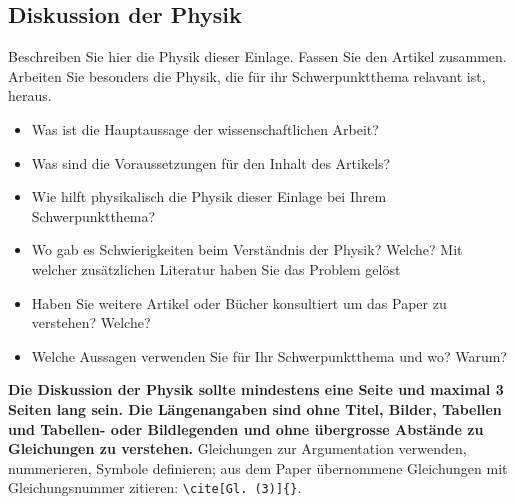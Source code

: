 \subsection{Diskussion der Physik}
\begin{hinweise}
Beschreiben Sie hier die Physik dieser Einlage. Fassen Sie den Artikel zusammen. Arbeiten Sie besonders die
Physik, die für ihr Schwerpunktthema relavant ist, heraus.
\begin{itemize}\itemsep0pt
\item Was ist die Hauptaussage der wissenschaftlichen Arbeit?
\item Was sind die Voraussetzungen für den Inhalt des Artikels?
\item Wie hilft physikalisch die Physik dieser Einlage bei Ihrem Schwerpunktthema?
\item Wo gab es Schwierigkeiten beim Verständnis der Physik? Welche? Mit welcher zusätzlichen Literatur haben Sie das Problem gelöst
\item Haben Sie weitere Artikel oder Bücher konsultiert um das Paper zu verstehen? Welche?
\item Welche Aussagen verwenden Sie für Ihr Schwerpunktthema und wo? Warum?
\end{itemize}
\textbf{Die Diskussion der Physik sollte mindestens eine Seite und maximal 3 Seiten lang sein. Die
Längenangaben sind ohne Titel, Bilder, Tabellen und Tabellen- oder Bildlegenden und ohne übergrosse Abstände
zu Gleichungen zu verstehen.}
Gleichungen zur Argumentation verwenden, nummerieren, Symbole definieren; aus dem Paper übernommene Gleichungen
mit Gleichungsnummer zitieren: \texttt{\textbackslash cite[Gl.~(3)]\{\PaperKey\}}.
\end{hinweise}
